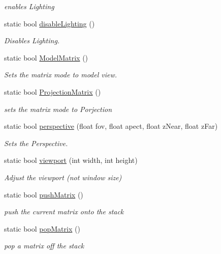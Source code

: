 \begin{DoxyCompactItemize}
\begin{DoxyCompactList}\small\item\em enables Lighting \end{DoxyCompactList}\item 
static bool \hyperlink{class_o_p_e_n_g_l___facade_a34b3c22afc3992e652e65f9740925905}{disable\-Lighting} ()
\begin{DoxyCompactList}\small\item\em Disables Lighting. \end{DoxyCompactList}\item 
static bool \hyperlink{class_o_p_e_n_g_l___facade_a51140f19e7d41523d175150893537386}{Model\-Matrix} ()
\begin{DoxyCompactList}\small\item\em Sets the matrix mode to model view. \end{DoxyCompactList}\item 
static bool \hyperlink{class_o_p_e_n_g_l___facade_abb4ebfd03cbeb5c43a454d5fa73aedd7}{Projection\-Matrix} ()
\begin{DoxyCompactList}\small\item\em sets the matrix mode to Porjection \end{DoxyCompactList}\item 
static bool \hyperlink{class_o_p_e_n_g_l___facade_a3ca12e04b6f352bc806042359a4377d8}{perspective} (float fov, float apect, float z\-Near, float z\-Far)
\begin{DoxyCompactList}\small\item\em Sets the Perspective. \end{DoxyCompactList}\item 
static bool \hyperlink{class_o_p_e_n_g_l___facade_a5a2c8c1819e3fa3ccbe6e952d5d0f762}{viewport} (int width, int height)
\begin{DoxyCompactList}\small\item\em Adjust the viewport (not window size) \end{DoxyCompactList}\item 
static bool \hyperlink{class_o_p_e_n_g_l___facade_a227c3c1029810af83c21640049ee47f0}{push\-Matrix} ()
\begin{DoxyCompactList}\small\item\em push the current matrix onto the stack \end{DoxyCompactList}\item 
static bool \hyperlink{class_o_p_e_n_g_l___facade_ae3e6e4f7454abea71dc3a7bfe15781b6}{pop\-Matrix} ()
\begin{DoxyCompactList}\small\item\em pop a matrix off the stack \end{DoxyCompactList}\item 

\end{DoxyCompactItemize}

